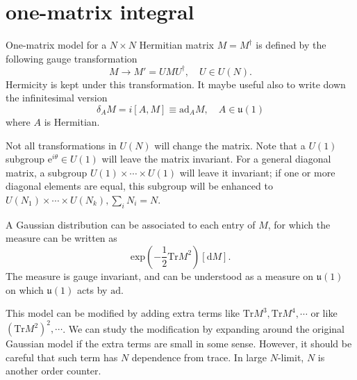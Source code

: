\section{one-matrix integral}
One-matrix model for a $N\times N$ Hermitian matrix $M=M^\dagger$ is defined by the following gauge transformation
\begin{equation}
    M \to M' = U M U^\dagger,\quad U\in U(N).
\end{equation}
Hermicity is kept under this transformation. It maybe useful also to write down the infinitesimal version
\begin{equation}
    \delta_A M = i[A,M] \equiv \mathrm{ad}_A M, \quad A\in\mathfrak{u}(1)
\end{equation}
where $A$ is Hermitian.

Not all transformations in $U(N)$ will change the matrix.
Note that a $U(1)$ subgroup $\mathrm{e}^{i\theta}\in U(1)$ will leave the matrix invariant.
For a general diagonal matrix, a subgroup $U(1)\times \cdots \times U(1)$ will leave it invariant;
if one or more diagonal elements are equal, this subgroup will be enhanced to $U(N_1)\times\cdots\times U(N_k),\sum_i N_i=N$.

A Gaussian distribution can be associated to each entry of $M$, for which the measure can be written as
\[\mathrm{exp}\left(-\frac{1}{2}\mathrm{Tr} M^2\right)[\mathrm{d}M].\]
The measure is gauge invariant, and can be understood as a measure on $\mathfrak{u}(1)$ on which $\mathfrak{u}(1)$ acts by $\mathrm{ad}$.

This model can be modified by adding extra terms like $\mathrm{Tr} M^3,\mathrm{Tr} M^4,\cdots$ or like $(\mathrm{Tr} M^2)^2,\cdots$. 
We can study the modification by expanding around the original Gaussian model if the extra terms are small in some sense.
However, it should be careful that such term has $N$ dependence from trace.
In large $N$-limit, $N$ is another order counter.

